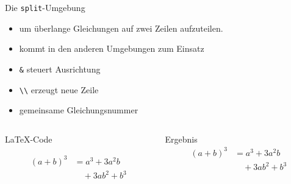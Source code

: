 \begin{frame}[fragile]{Die \texttt{split}-Umgebung}
    \begin{itemize}
        \item um überlange Gleichungen auf zwei Zeilen aufzuteilen.
        \item kommt in den anderen Umgebungen zum Einsatz
        \item \texttt{\&} steuert Ausrichtung
        \item \texttt{\textbackslash\textbackslash} erzeugt neue Zeile
        \item gemeinsame Gleichungsnummer
    \end{itemize}
  \begin{columns}[T]
    \begin{column}{0.55\textwidth}
      \begin{block}{\LaTeX-Code}
        \begin{lstverbatim}
        \begin{equation}
            \begin{split}
                (a+b)^3 & = a^3 + 3a^2b \\
                        & \quad +3ab^2 + b^3
            \end{split}
        \end{equation}
        \end{lstverbatim}
      \end{block}
    \end{column}
    \begin{column}{0.40\textwidth}
      \begin{block}{Ergebnis}
          \vspace{0.5em}
        \begin{equation}
            \begin{split}
                (a+b)^3 & = a^3 + 3a^2b \\
                        & \quad +3ab^2 + b^3
            \end{split}
        \end{equation}
      \end{block}
    \end{column}
  \end{columns}
\end{frame}
